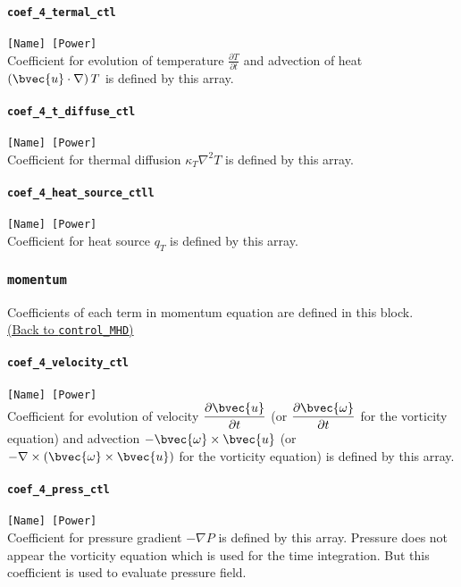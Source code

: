 \paragraph{\tt coef\_4\_termal\_ctl}
\label{href_t:coef_4_termal_ctl}
\verb|[Name] [Power]| \\
Coefficient for evolution of temperature $\displaystyle \frac{\partial T}{\partial t}$ and advection of heat $\left(\bvec{u} \cdot \nabla \right) T$ is defined by this array.

\paragraph{\tt coef\_4\_t\_diffuse\_ctl}
\label{href_t:coef_4_t_diffuse_ctl}
\verb|[Name] [Power]| \\
Coefficient for thermal diffusion $\displaystyle \kappa_{T} \nabla^{2} T$ is defined by this array.

\paragraph{\tt coef\_4\_heat\_source\_ctll}
\label{href_t:coef_4_heat_source_ctl}
\verb|[Name] [Power]| \\
Coefficient for heat source $\displaystyle q_{T}$ is defined by this array.

\subsubsection{\tt momentum}
\label{href_t:momentum}
Coefficients of each term in momentum equation are defined in this block. \\
\hyperref[href_i:momentum]{(Back to {\tt control\_MHD})}

\paragraph{\tt coef\_4\_velocity\_ctl}
\label{href_t:coef_4_velocity_ctl}
\verb|[Name] [Power]| \\
Coefficient for evolution of velocity $\displaystyle \frac{\partial \bvec{u}}{\partial t}$ (or $\displaystyle \frac{\partial \bvec{\omega}}{\partial t}$ for the vorticity equation) and advection $-\bvec{\omega} \times \bvec{u}$ (or $- \nabla \times \left(\bvec{\omega} \times \bvec{u} \right)$ for the vorticity equation) is defined by this array.

\paragraph{\tt coef\_4\_press\_ctl}
\label{href_t:coef_4_press_ctl}
\verb|[Name] [Power]| \\
Coefficient for pressure gradient $-\nabla P$ is defined by this array. Pressure does not appear the vorticity equation which is used for the time integration. But this coefficient is used to evaluate pressure field.

